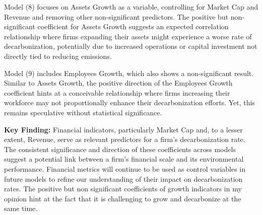Model (8) focuses on Assets Growth as a variable, controlling for Market Cap and Revenue and removing other non-significant predictors. The positive but non-significant coefficient for Assets Growth suggests an expected correlation relationship where firms expanding their assets might experience a worse rate of decarbonization, potentially due to increased operations or capital investment not directly tied to reducing emissions. 
    

Model (9) includes Employees Growth, which also shows a non-significant result. Similar to Assets Growth, the positive direction of the Employees Growth coefficient hints at a conceivable relationship where firms increasing their workforce may not proportionally enhance their decarbonization efforts. Yet, this remains speculative without statistical significance. 
    

\textbf{Key Finding:} Financial indicators, particularly Market Cap and, to a lesser extent, Revenue, serve as relevant predictors for a firm's decarbonization rate. The consistent significance and direction of these coefficients across models suggest a potential link between a firm's financial scale and its environmental performance. Financial metrics will continue to be used as control variables in future models to refine our understanding of their impact on decarbonization rates. The positive but non significant coefficients of growth indicators in my opinion hint at the fact that it is challenging to grow and decarbonize at the same time.





